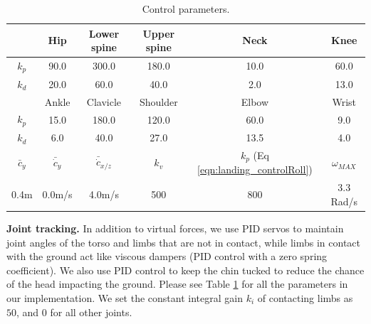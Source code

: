 \begin{table}
\center
{
\caption{Control parameters. 
}


\begin{tabular}{|c |c|c|c|c|c| }
\hline
\label{tab:landing_tracking}

& {\small Hip} & {\small Lower spine } & {\small Upper spine } & {\small Neck } & {\small Knee } \\ \hline 
\textbf{$k_p$} & {\small 90.0} & {\small 300.0}& {\small 180.0}& {\small 10.0} & {\small 60.0} \\ \hline 
\textbf{$k_d$} & {\small 20.0} & {\small 60.0} & {\small 40.0} & {\small  2.0} & {\small 13.0} \\ \hline


& {\small Ankle } & {\small Clavicle } & {\small Shoulder} & {\small Elbow } & {\small Wrist } \\ \hline 
\textbf{$k_p$} & {\small 15.0} & {\small 180.0}& {\small 120.0}& {\small 60.0} & {\small  9.0} \\ \hline
\textbf{$k_d$} & {\small  6.0} & {\small 40.0} & {\small 27.0} & {\small 13.5} & {\small  4.0} \\ \hline



\hline
{\small \textbf{$\bar{c}_y$} } &
{\small \textbf{$\bar{\dot{c}}_y$} } &
{\small \textbf{$\bar{\dot{c}}_{x/z}$} } &
{\small \textbf{$k_v$} } &
{\small \textbf{$k_p$} (Eq \ref{eqn:landing_controlRoll}) } &  
{\small \textbf{$\omega_{MAX}$} } \\ \hline

{\small 0.4m} & {\small 0.0m/s} & {\small 4.0m/s} & {\small 500} & {\small 800} & {\small 3.3 Rad/s} \\ \hline
\end{tabular}
}
\end{table}


\textbf{Joint tracking.} In addition to virtual forces, we use PID
servos to maintain joint angles of the torso and limbs that are not in
contact, while limbs in contact with the ground act like viscous
dampers (PID control with a zero spring coefficient). We also use PID
control to keep the chin tucked to reduce the chance of the head
impacting the ground. Please see Table \ref{tab:landing_tracking} for all the
parameters in our implementation. We set the constant integral gain
$k_i$ of contacting limbs as $50$, and $0$ for all other joints.



